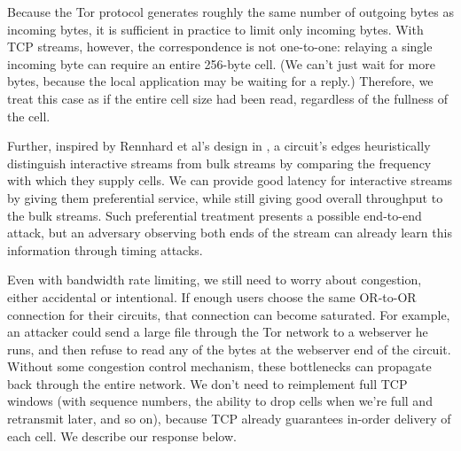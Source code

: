 \documentclass[times,10pt,twocolumn]{article}
\begin{document}

Because the Tor protocol generates roughly the same number of outgoing
bytes as incoming bytes, it is sufficient in practice to limit only
incoming bytes.
With TCP streams, however, the correspondence is not one-to-one:
relaying a single incoming byte can require an entire 256-byte cell.
(We can't just wait for more bytes, because the local application may
be waiting for a reply.) Therefore, we treat this case as if the entire
cell size had been read, regardless of the fullness of the cell.

Further, inspired by Rennhard et al's design in \cite{anonnet}, a
circuit's edges heuristically distinguish interactive streams from bulk
streams by comparing the frequency with which they supply cells.  We can
provide good latency for interactive streams by giving them preferential
service, while still giving good overall throughput to the bulk
streams. Such preferential treatment presents a possible end-to-end
attack, but an adversary observing both
ends of the stream can already learn this information through timing
attacks.

\label{subsec:congestion}

Even with bandwidth rate limiting, we still need to worry about
congestion, either accidental or intentional. If enough users choose the
same OR-to-OR connection for their circuits, that connection can become
saturated. For example, an attacker could send a large file
through the Tor network to a webserver he runs, and then
refuse to read any of the bytes at the webserver end of the
circuit. Without some congestion control mechanism, these bottlenecks
can propagate back through the entire network. We don't need to
reimplement full TCP windows (with sequence numbers,
the ability to drop cells when we're full and retransmit later, and so
on),
because TCP already guarantees in-order delivery of each
cell. 
We describe our response below.
\end{document}
